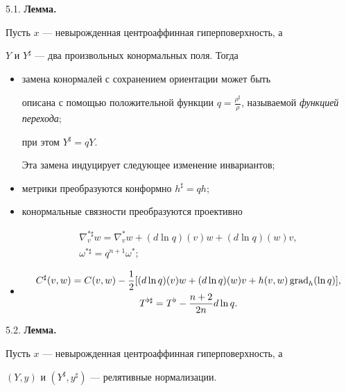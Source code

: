 5.1. {\bf Лемма.}


Пусть $x$ --- невырожденная центроаффинная гиперповерхность, а


$Y$ и $Y^\sharp$ --- два произвольных конормальных поля. Тогда


\begin{itemize}


\item[(i)] замена конормалей с сохранением ориентации может быть


описана с помощью положительной функции $q= \frac


{\rho^{\sharp}}{\rho}$, называемой {\it функцией перехода}\/;


при этом $Y^{\sharp} = qY$.


Эта замена индуцирует следующее изменение инвариантов;


\item[(ii)] метрики преобразуются конформно $h^{\sharp} = qh$;


\item[(iii)] конормальные связности преобразуются проективно


\begin{gather*}


\nabla^{*\sharp}_v w =\nabla^{*}_v w + (d \ln q)(v)w + (d \ln q)(w)v,\\


\omega^{* \sharp} = q^{n+1} \omega ^*;


\end{gather*}


\item[(iv)]


\begin{gather*}


C^{\sharp} (v,w)= C(v,w) - \frac{1}{2} [(d \ln q)(v)


w + (d \ln q)(w)v + h(v,w) \grad _h (\ln q)], \\


T^{\flat \sharp}  = T^{\flat} - \frac{n+2}{2n} d \ln q.


\end{gather*}


\end{itemize}





5.2. {\bf Лемма.}


Пусть $x$ --- невырожденная центроаффинная гиперповерхность, а


$(Y,y)$ и $(Y^{\sharp},y^{\sharp})$ --- релятивные нормализации.


